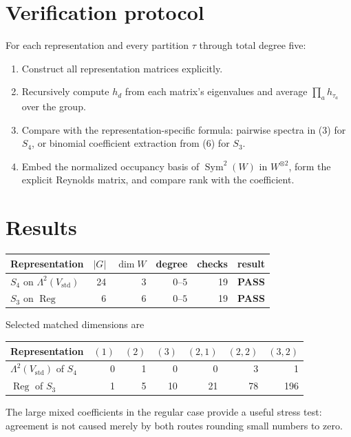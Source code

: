 \documentclass[11pt]{article}
\newcommand{\Sym}{\operatorname{Sym}}
\newcommand{\Reg}{\operatorname{Reg}}
\newcommand{\PASS}{\textcolor{passgreen}{\textbf{PASS}}}
\begin{document}
\section{Verification protocol}

For each representation and every partition $\tau$ through total degree five:
\begin{enumerate}[leftmargin=*,itemsep=3pt]
\item Construct all representation matrices explicitly.
\item Recursively compute $h_d$ from each matrix's eigenvalues and average
$\prod_a h_{\tau_a}$ over the group.
\item Compare with the representation-specific formula: pairwise spectra in
(3) for $S_4$, or binomial coefficient extraction from (6) for $S_3$.
\item Embed the normalized occupancy basis of $\Sym^2(W)$ in $W^{\otimes2}$,
form the explicit Reynolds matrix, and compare rank with the coefficient.
\end{enumerate}

\section{Results}

\begin{center}
\begin{tabularx}{\linewidth}{@{}Xrrrrc@{}}
\toprule
Representation & $|G|$ & $\dim W$ & degree & checks & result\\
\midrule
$S_4$ on $\Lambda^2(V_{\mathrm{std}})$ & 24 & 3 & $0$--$5$ & 19 & \PASS\\
$S_3$ on $\Reg$ & 6 & 6 & $0$--$5$ & 19 & \PASS\\
\bottomrule
\end{tabularx}
\end{center}

Selected matched dimensions are
\begin{center}
\begin{tabular}{@{}lrrrrrr@{}}
\toprule
Representation & $(1)$ & $(2)$ & $(3)$ & $(2,1)$ & $(2,2)$ & $(3,2)$\\
\midrule
$\Lambda^2(V_{\mathrm{std}})$ of $S_4$ & 0 & 1 & 0 & 0 & 3 & 1\\
$\Reg$ of $S_3$ & 1 & 5 & 10 & 21 & 78 & 196\\
\bottomrule
\end{tabular}
\end{center}
The large mixed coefficients in the regular case provide a useful stress test:
agreement is not caused merely by both routes rounding small numbers to zero.
\end{document}
